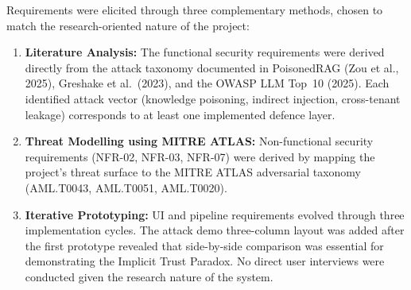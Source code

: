 Requirements were elicited through three complementary methods, chosen to match the
research-oriented nature of the project:
\begin{enumerate}
    \item \textbf{Literature Analysis:} The functional security requirements were derived
          directly from the attack taxonomy documented in PoisonedRAG (Zou et al., 2025),
          Greshake et al.\ (2023), and the OWASP LLM Top~10 (2025). Each identified attack
          vector (knowledge poisoning, indirect injection, cross-tenant leakage) corresponds
          to at least one implemented defence layer.
    \item \textbf{Threat Modelling using MITRE ATLAS:} Non-functional security requirements
          (NFR-02, NFR-03, NFR-07) were derived by mapping the project's threat surface to
          the MITRE ATLAS adversarial taxonomy (AML.T0043, AML.T0051, AML.T0020).
    \item \textbf{Iterative Prototyping:} UI and pipeline requirements evolved through three
          implementation cycles. The attack demo three-column layout was added after the
          first prototype revealed that side-by-side comparison was essential for
          demonstrating the Implicit Trust Paradox. No direct user interviews were conducted
          given the research nature of the system.
\end{enumerate}

